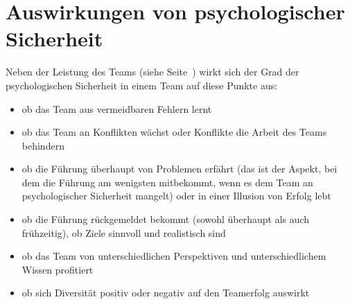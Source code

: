 \section{Auswirkungen von psychologischer Sicherheit}
\label{ps-auswirkungen}


Neben der Leistung des Teams (siehe Seite~\pageref{ps-leistung}) wirkt sich der Grad der psychologischen Sicherheit in einem Team auf diese Punkte aus:

\begin{itemize}
  \item ob das Team aus vermeidbaren Fehlern lernt 
  \item ob das Team an Konflikten wächst oder Konflikte die Arbeit des Teams behindern 
  \item ob die Führung überhaupt von Problemen erfährt (das ist der Aspekt, bei dem die Führung am wenigsten mitbekommt, wenn es dem Team an psychologischer Sicherheit mangelt)  oder in einer Illusion von Erfolg lebt
  \item ob die Führung rückgemeldet bekommt (sowohl überhaupt als auch frühzeitig), ob Ziele sinnvoll und realistisch sind 
  \item ob das Team von unterschiedlichen Perspektiven und unterschiedlichem Wissen profitiert
  \item ob sich Diversität positiv oder negativ auf den Teamerfolg auswirkt 
\end{itemize}
